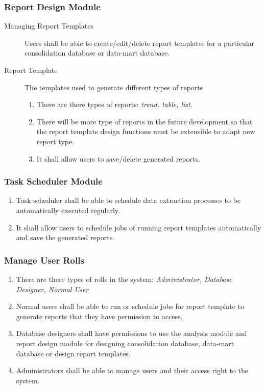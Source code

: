 \documentclass[11pt]{article}
\begin{document}
\subsubsection{Report Design Module}
\begin{description}
  \item[Managing Report Templates] Users shall be able to create/edit/delete report templates for a particular consolidation database or data-mart database.
  \item[Report Template] The templates used to generate different types of reports
    \begin{enumerate}
      \item There are there types of reports: \textit{trend, table, list}.
      \item There will be more type of reports in the future development so that the report template design functions must be extensible to adapt new report type.
      \item It shall allow users to save/delete generated reports.
    \end{enumerate}
\end{description}

\subsubsection{Task Scheduler Module}
\begin{enumerate}
  \item Task scheduler shall be able to schedule data extraction processes to be automatically executed regularly.
  \item It shall allow users to schedule jobs of running report templates automatically and save the generated reports.
\end{enumerate}

\subsubsection{Manage User Rolls}
\begin{enumerate}
  \item There are there types of rolls in the system: \textit{Administrator, Database Designer, Normal User}
  \item Normal users shall be able to run or schedule jobs for report template to generate reports that they have permission to access.
  \item Database designers shall have permissions to use the analysis module and report design module for designing consolidation database, data-mart database or design report templates.
  \item Administrators shall be able to manage users and their access right to the system.
\end{enumerate}
\end{document}
